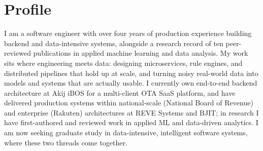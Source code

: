 \section{\textbf{Profile}}
I am a software engineer with over four years of production experience building backend and data-intensive systems, alongside a research record of ten peer-reviewed publications in applied machine learning and data analysis. My work sits where engineering meets data: designing microservices, rule engines, and distributed pipelines that hold up at scale, and turning noisy real-world data into models and systems that are actually usable. I currently own end-to-end backend architecture at Akij iBOS for a multi-client OTA SaaS platform, and have delivered production systems within national-scale (National Board of Revenue) and enterprise (Rakuten) architectures at REVE Systems and BJIT; in research I have first-authored and reviewed work in applied ML and data-driven analytics. I am now seeking graduate study in data-intensive, intelligent software systems, where these two threads come together.
